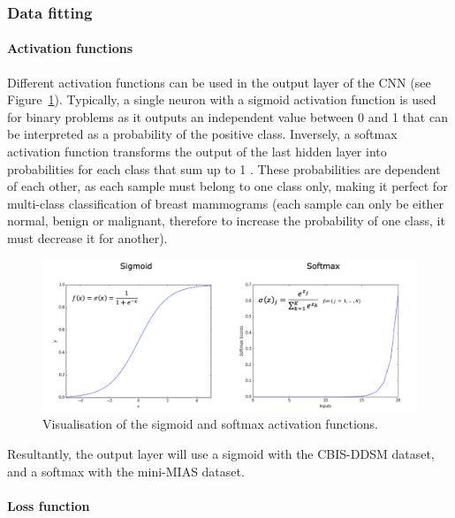 \subsubsection{Data fitting}

\paragraph{Activation functions}

Different activation functions can be used in the output layer of the CNN (see Figure~\ref{fig:design-activation functions}). Typically, a single neuron with a sigmoid activation function is used for binary problems as it outputs an independent value between 0 and 1 that can be interpreted as a probability of the positive class. Inversely, a softmax activation function transforms the output of the last hidden layer into probabilities for each class that sum up to 1 \citep{Litjens2017}. These probabilities are dependent of each other, as each sample must belong to one class only, making it perfect for multi-class classification of breast mammograms (each sample can only be either normal, benign or malignant, therefore to increase the probability of one class, it must decrease it for another).

\begin{figure}[ht]
\centerline{\includegraphics[width=1.1\textwidth]{figures/design/activation functions.png}}
\caption{\label{fig:design-activation functions}Visualisation of the sigmoid and softmax activation functions.}
\end{figure}

Resultantly, the output layer will use a sigmoid with the CBIS-DDSM dataset, and a softmax with the mini-MIAS dataset.

\paragraph{Loss function}

